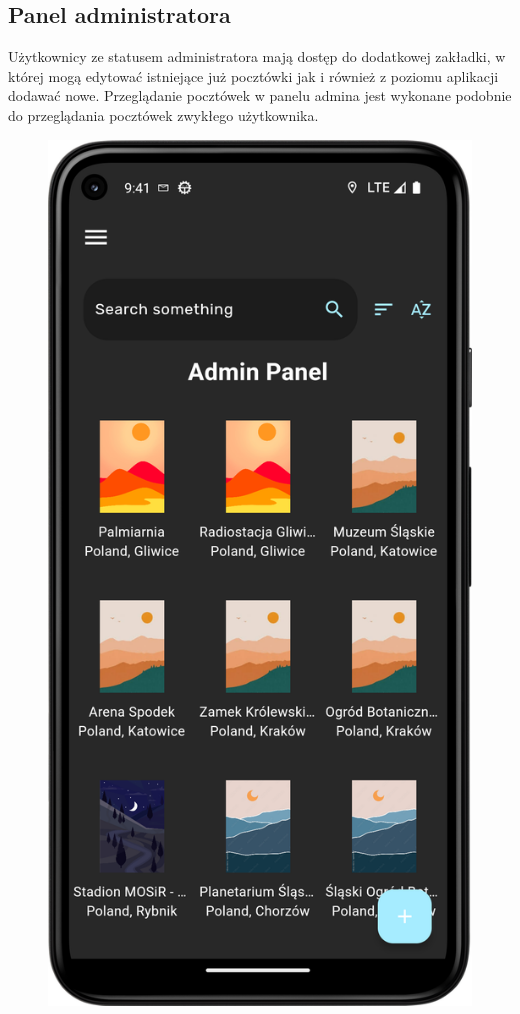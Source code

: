 \documentclass[a4paper,twoside,12pt]{book}
\begin{document}
\subsection{Panel administratora}
Użytkownicy ze statusem administratora mają dostęp do dodatkowej zakładki, w której mogą edytować istniejące już pocztówki jak i również z poziomu aplikacji dodawać nowe. Przeglądanie pocztówek w panelu admina jest wykonane podobnie do przeglądania pocztówek zwykłego użytkownika.

\begin{figure}[H]
  \centering
  \begin{minipage}[b]{0.49\textwidth}
    \includegraphics[width=\textwidth]{mobile_ss/admin.png}

\end{minipage}
\end{figure}
\end{document}
